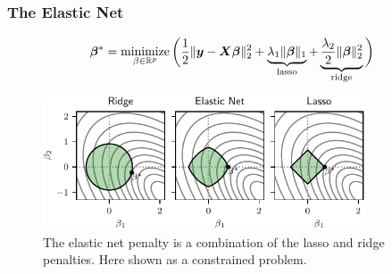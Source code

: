 \documentclass[10pt]{beamer}
\begin{document}
\begin{frame}[c]
  \frametitle{The Elastic Net}

  \begin{equation*}
    \bm{\beta}^* = \operatorname*{minimize}_{\beta \in \mathbb{R}^p} \bigg( \frac{1}{2} \lVert \bm{y} - \bm{X}\bm{\beta} \rVert^2_2  + \underbrace{\lambda_1 \lVert \bm{\beta} \rVert_1}_\text{lasso} + \underbrace{\frac{\lambda_2}{2}\lVert \bm{\beta} \rVert_2^2}_\text{ridge}\bigg)
  \end{equation*}

  \pause

  \begin{figure}
    \centering
    \includegraphics[width=0.85\textwidth]{figures/paper6-elasticnet-balls.pdf}
    \caption{%
      The elastic net penalty is a combination of the lasso and ridge penalties. Here shown as a constrained problem.
    }
  \end{figure}
\end{frame}
\end{document}
